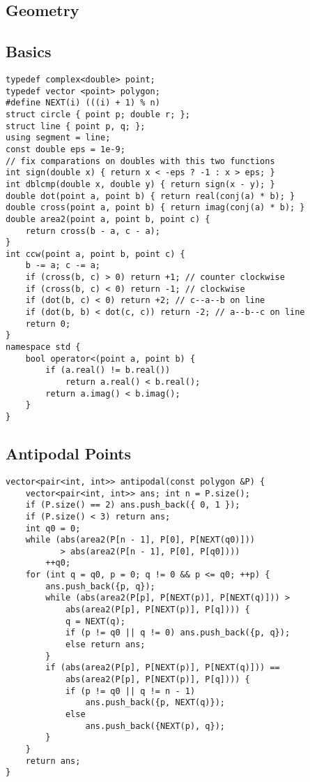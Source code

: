 \documentclass[landscape, 8pt, a4paper, oneside]{extarticle}
\begin{document}
\begin{multicols}{3}
\section{Geometry}
\subsection{Basics}
\begin{verbatim}
typedef complex<double> point;
typedef vector <point> polygon;
#define NEXT(i) (((i) + 1) % n)
struct circle { point p; double r; };
struct line { point p, q; };
using segment = line;
const double eps = 1e-9;
// fix comparations on doubles with this two functions
int sign(double x) { return x < -eps ? -1 : x > eps; }
int dblcmp(double x, double y) { return sign(x - y); }
double dot(point a, point b) { return real(conj(a) * b); }
double cross(point a, point b) { return imag(conj(a) * b); }
double area2(point a, point b, point c) {
    return cross(b - a, c - a);
}
int ccw(point a, point b, point c) {
    b -= a; c -= a;
    if (cross(b, c) > 0) return +1; // counter clockwise
    if (cross(b, c) < 0) return -1; // clockwise
    if (dot(b, c) < 0) return +2; // c--a--b on line
    if (dot(b, b) < dot(c, c)) return -2; // a--b--c on line
    return 0;
}
namespace std {
    bool operator<(point a, point b) {
        if (a.real() != b.real())
            return a.real() < b.real();
        return a.imag() < b.imag();
    }
}
\end{verbatim}
\subsection{Antipodal Points}
\begin{verbatim}
vector<pair<int, int>> antipodal(const polygon &P) {
    vector<pair<int, int>> ans; int n = P.size();
    if (P.size() == 2) ans.push_back({ 0, 1 });
    if (P.size() < 3) return ans;
    int q0 = 0;
    while (abs(area2(P[n - 1], P[0], P[NEXT(q0)]))
           > abs(area2(P[n - 1], P[0], P[q0])))
        ++q0;
    for (int q = q0, p = 0; q != 0 && p <= q0; ++p) {
        ans.push_back({p, q});
        while (abs(area2(P[p], P[NEXT(p)], P[NEXT(q)])) >
            abs(area2(P[p], P[NEXT(p)], P[q]))) {
            q = NEXT(q);
            if (p != q0 || q != 0) ans.push_back({p, q});
            else return ans;
        }
        if (abs(area2(P[p], P[NEXT(p)], P[NEXT(q)])) ==
            abs(area2(P[p], P[NEXT(p)], P[q]))) {
            if (p != q0 || q != n - 1)
                ans.push_back({p, NEXT(q)});
            else
                ans.push_back({NEXT(p), q});
        }
    }
    return ans;
}
\end{verbatim}

\end{multicols}
\end{document}

